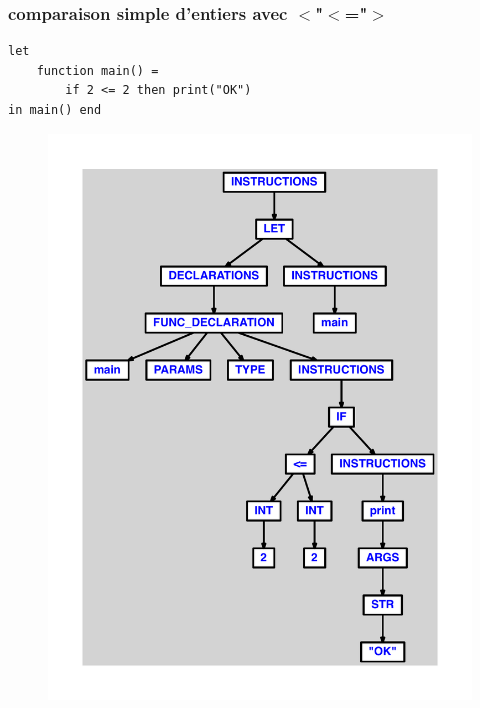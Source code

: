 \documentclass{article}
\begin{document}
\subsubsection{comparaison simple d'entiers avec $ < $"$ < $="$ > $}
\begin{lstlisting}
let
	function main() =
		if 2 <= 2 then print("OK")
in main() end
\end{lstlisting}
\newpage
\begin{figure}[H]
\centering
\includegraphics[max width=\textwidth]{ast/ast_169.pdf}
\end{figure}
\newpage
\end{document}
